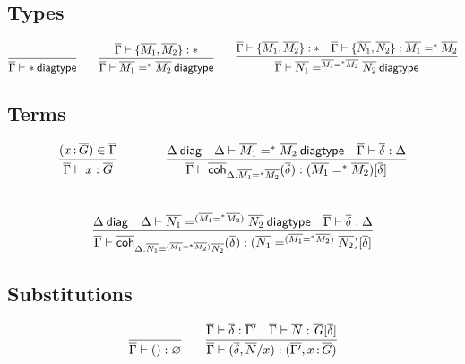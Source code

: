 \subsection{Types}

\begin{small}
  \[
  \infer{\wfdiagtp{\diag\Gamma}{\diagbase}}{}
  \qquad
  \infer
    {\wfdiagtp{\diag\Gamma}{\iid{\diagbase}{\diag{M_1}}{\diag{M_2}}}}
    {\ofdiagtp{\diag\Gamma}{\{\diag{M_1},\diag{M_2}\}}{\diagbase}}
  \qquad
  \infer
    {\wfdiagtp{\diag\Gamma}{\iid{\iid{\diagbase}{\diag{M_1}}{\diag{M_2}}}{\diag{N_1}}{\diag{N_2}}}}
    {\ofdiagtp{\diag\Gamma}{\{\diag{M_1},\diag{M_2}\}}{\diagbase}
    &\ofdiagtp{\diag\Gamma}{\{\diag{N_1},\diag{N_2}\}}{\iid{\diagbase}{\diag{M_1}}{\diag{M_2}}}}
  \]
\end{small}

\subsection{Terms}

\begin{small}
  \[
  \infer{\ofdiaglob{\diag\Gamma}{x}{\diag G}}
        {(\tptm{x}{\diag G})\in\diag\Gamma}
  \qquad\qquad
  \def\diagG{\iid{\diagbase}{\diag{M_1}}{\diag{M_2}}}
  \infer{\ofdiaglob{\diag\Gamma}{\diagcoh{\Delta.\diagG}{\diag\delta}}{(\diagG)[\diag\delta]}}
        {\wfdiag{\Delta} 
        &\wfdiagtp{\Delta}{\diagG}
        &\substdiaglob{\diag\Gamma}{\diag\delta}{\Delta}}
  \]
  \\
  \[
  \def\diagG{\iid{(\iid{\diagbase}{\diag{M_1}}{\diag{M_2}})}{\diag{N_1}}{\diag{N_2}}}
  \infer{\ofdiaglob{\diag\Gamma}{\diagcoh{\Delta.\diagG}{\diag\delta}}{(\diagG)[\diag\delta]}}
        {\wfdiag{\Delta} 
        &\wfdiagtp{\Delta}{\diagG}
        &\substdiaglob{\diag\Gamma}{\diag\delta}{\Delta}}
  \]
\end{small}

\subsection{Substitutions}

\begin{small}
  \[
  \infer{\substdiaglob{\diag\Gamma}{()}{\emptyctx}}
  {}
  \qquad
  \infer{\substdiaglob{\diag\Gamma}{(\diag \delta,\diag N/x)}
    {(\diag{\Gamma'},\tptm{x}{\diag G})}}
  {\substdiaglob{\diag\Gamma}{\diag \delta}{\diag{\Gamma'}}
    & \ofdiaglob{\diag\Gamma}{\diag N}{\tsubst{\diag G}{\diag \delta}}}
  \]
\end{small}

